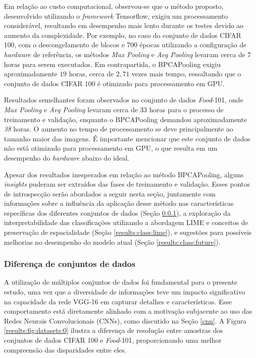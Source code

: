 Em relação ao custo computacional, observou-se que o método proposto, desenvolvido utilizando o \textit{framework} Tensorflow, exigiu um processamento considerável, resultando em desempenho mais lento durante os testes devido ao aumento da complexidade. Por exemplo, no caso do conjunto de dados CIFAR 100, com o descongelamento de blocos e $700$ épocas utilizando a configuração de \textit{hardware} de referência, os métodos \textit{Max Pooling} e \textit{Avg Pooling} levaram cerca de $7$ horas para serem executados. Em contrapartida, o BPCAPooling exigiu aproximadamente $19$ horas, cerca de $2,71$ vezes mais tempo, ressaltando que o conjunto de dados CIFAR 100 é otimizado para processamento em GPU.

Resultados semelhantes foram observados no conjunto de dados \textit{Food}-101, onde \textit{Max Pooling} e \textit{Avg Pooling} levaram cerca de $33$ horas para o processo de treinamento e validação, enquanto o BPCAPooling demandou aproximadamente \textit{38} horas. O aumento no tempo de processamento se deve principalmente ao tamanho maior das imagens. É importante mencionar que este conjunto de dados não está otimizado para processamento em GPU, o que resulta em um desempenho do \textit{hardware} abaixo do ideal.

Apesar dos resultados inesperados em relação ao método BPCAPooling, alguns \textit{insights} puderam ser extraídos das fases de treinamento e validação. Esses pontos de introspecção serão abordados a seguir nesta seção, juntamente com informações sobre a influência da aplicação desse método nas características específicas dos diferentes conjuntos de dados (Seção \ref{results:class:datasets}), a exploração da interpretabilidade das classificações utilizando a abordagem LIME e conceitos de preservação de espacialidade (Seção \ref{results:class:lime}), e sugestões para possíveis melhorias no desempenho do modelo atual (Seção \ref{results:class:future}).


\subsubsection{Diferença de conjuntos de dados}
\label{results:class:datasets}
A utilização de múltiplos conjuntos de dados foi fundamental para o presente estudo, uma vez que a diversidade de informações teve um impacto significativo na capacidade da rede VGG-16 em capturar detalhes e características. Esse comportamento está diretamente alinhado com a motivação subjacente ao uso das Redes Neurais Convolucionais (CNNs), como discutido na Seção \ref{cnn}. A Figura \ref{results:fig:datasets:0} ilustra a diferença de resolução entre amostras dos conjuntos de dados CIFAR 100 e \textit{Food}-101, proporcionando uma melhor compreensão das disparidades entre eles.

